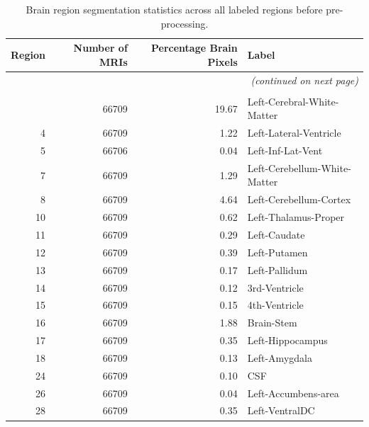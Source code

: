 \documentclass[pdflatex,sn-nature]{sn-jnl}%
\theoremstyle{thmstyleone}%
\theoremstyle{thmstyletwo}%
\theoremstyle{thmstylethree}%
\begin{document}
\begin{appendices}
\begin{small}
\begin{longtable}{r|r|r|l}
\toprule
\textbf{Region} &  \textbf{Number of MRIs} &  \textbf{Percentage Brain Pixels} &                          \textbf{ Label} \\
\midrule
\endhead

\midrule
\multicolumn{4}{r}{\textit{(continued on next page)}} \\
\endfoot

\bottomrule
\caption{Brain region segmentation statistics across all labeled regions before pre-processing.}
\label{tab:brain_region_segmentation}\\
\endlastfoot
      2 &     66709 &               19.67 &      Left-Cerebral-White-Matter \\
      4 &     66709 &                1.22 &          Left-Lateral-Ventricle \\
      5 &     66706 &                0.04 &               Left-Inf-Lat-Vent \\
      7 &     66709 &                1.29 &    Left-Cerebellum-White-Matter \\
      8 &     66709 &                4.64 &          Left-Cerebellum-Cortex \\
     10 &     66709 &                0.62 &            Left-Thalamus-Proper \\
     11 &     66709 &                0.29 &                    Left-Caudate \\
     12 &     66709 &                0.39 &                    Left-Putamen \\
     13 &     66709 &                0.17 &                   Left-Pallidum \\
     14 &     66709 &                0.12 &                   3rd-Ventricle \\
     15 &     66709 &                0.15 &                   4th-Ventricle \\
     16 &     66709 &                1.88 &                      Brain-Stem \\
     17 &     66709 &                0.35 &                Left-Hippocampus \\
     18 &     66709 &                0.13 &                   Left-Amygdala \\
     24 &     66709 &                0.10 &                             CSF \\
     26 &     66709 &                0.04 &             Left-Accumbens-area \\
     28 &     66709 &                0.35 &                  Left-VentralDC \\

\end{longtable}
\end{small}
\end{appendices}
\end{document}
